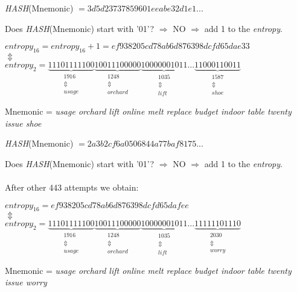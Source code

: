 \begin{center}
	\textit{HASH}(Mnemonic) $= 3d5d23737859601eeabe32d1e1...$
\end{center}
Does \textit{HASH}(Mnemonic) start with '01'? $\Rightarrow$ NO $\Rightarrow$ add 1 to the \textit{entropy}.
\begin{center}
	$entropy_{16} = entropy_{16} + 1  = ef938205cd78ab6d876398dcfd65dae33$
	\\
	$\Updownarrow $
	\\
	$entropy_{2}= \underbrace{11101111100}_{\substack{1916 \\ \Updownarrow\\ usage} }
	\underbrace{10011100000}_{\substack{1248 \\ \Updownarrow\\ orchard}}
	\underbrace{10000001011}_{\substack{1035 \\ \Updownarrow\\ lift}}
	...
	\underbrace{11000110011}_{\substack{1587 \\ \Updownarrow\\ shoe}}  $
\end{center}
Mnemonic = \textit{usage orchard lift online melt replace budget indoor table twenty issue shoe}

\begin{center}
	\textit{HASH}(Mnemonic) $= 2a3b2cf6a0506844a77baf8175...$
\end{center}
Does \textit{HASH}(Mnemonic) start with '01'? $\Rightarrow$ NO $\Rightarrow$ add 1 to the \textit{entropy}.
\\ \\
After other 443 attempts we obtain:
\begin{center}
	$entropy_{16} =ef938205cd78ab6d876398dcfd65dafee$
	\\
	$\Updownarrow $
	\\
	$entropy_{2}= \underbrace{11101111100}_{\substack{1916 \\ \Updownarrow\\ usage} }
	\underbrace{10011100000}_{\substack{1248 \\ \Updownarrow\\ orchard}}
	\underbrace{10000001011}_{\substack{1035 \\ \Updownarrow\\ lift}}
	...
	\underbrace{11111101110}_{\substack{2030 \\ \Updownarrow\\ worry}}  $
\end{center}
Mnemonic = \textit{usage orchard lift online melt replace budget indoor table twenty issue worry}

